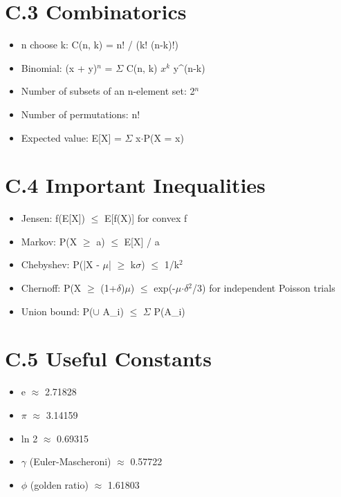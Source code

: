 \section{C.3 Combinatorics}

\begin{itemize}
\item n choose k: C(n, k) = n! / (k! (n-k)!)
\item Binomial: (x + y)$^{n}$ = $\Sigma $ C(n, k) $x^{k}$ y\textasciicircum{}(n-k)
\item Number of subsets of an n-element set: 2$^{n}$
\item Number of permutations: n!
\item Expected value: E[X] = $\Sigma $ x$\cdot $P(X = x)
\end{itemize}

\section{C.4 Important Inequalities}

\begin{itemize}
\item Jensen: f(E[X]) $\le $ E[f(X)] for convex f
\item Markov: P(X $\ge $ a) $\le $ E[X] / a
\item Chebyshev: P(|X - $\mu $| $\ge $ k$\sigma $) $\le $ 1/k$^{2}$
\item Chernoff: P(X $\ge $ (1+$\delta $)$\mu $) $\le $ exp(-$\mu $$\cdot $$\delta $$^{2}$/3) for independent Poisson trials
\item Union bound: P($\cup $ A\_i) $\le $ $\Sigma $ P(A\_i)
\end{itemize}

\section{C.5 Useful Constants}

\begin{itemize}
\item e $\approx $ 2.71828
\item $\pi $ $\approx $ 3.14159
\item ln 2 $\approx $ 0.69315
\item $\gamma $ (Euler-Mascheroni) $\approx $ 0.57722
\item $\phi $ (golden ratio) $\approx $ 1.61803
\end{itemize}


